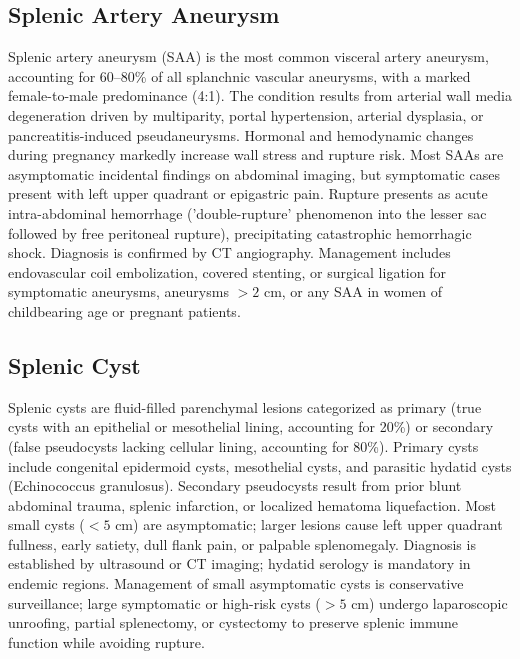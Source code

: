 \subsection{Splenic Artery Aneurysm}
\label{sec:Splenic Artery Aneurysm}
Splenic artery aneurysm (SAA) is the most common visceral artery aneurysm, accounting for 60--80\% of all splanchnic vascular aneurysms, with a marked female-to-male predominance (4:1). The condition results from arterial wall media degeneration driven by multiparity, portal hypertension, arterial dysplasia, or pancreatitis-induced pseudaneurysms. Hormonal and hemodynamic changes during pregnancy markedly increase wall stress and rupture risk. Most SAAs are asymptomatic incidental findings on abdominal imaging, but symptomatic cases present with left upper quadrant or epigastric pain. Rupture presents as acute intra-abdominal hemorrhage ('double-rupture' phenomenon into the lesser sac followed by free peritoneal rupture), precipitating catastrophic hemorrhagic shock. Diagnosis is confirmed by CT angiography. Management includes endovascular coil embolization, covered stenting, or surgical ligation for symptomatic aneurysms, aneurysms $>2$ cm, or any SAA in women of childbearing age or pregnant patients.

\subsection{Splenic Cyst}
\label{sec:Splenic Cyst}
Splenic cysts are fluid-filled parenchymal lesions categorized as primary (true cysts with an epithelial or mesothelial lining, accounting for 20\%) or secondary (false pseudocysts lacking cellular lining, accounting for 80\%). Primary cysts include congenital epidermoid cysts, mesothelial cysts, and parasitic hydatid cysts (Echinococcus granulosus). Secondary pseudocysts result from prior blunt abdominal trauma, splenic infarction, or localized hematoma liquefaction. Most small cysts ($<5$ cm) are asymptomatic; larger lesions cause left upper quadrant fullness, early satiety, dull flank pain, or palpable splenomegaly. Diagnosis is established by ultrasound or CT imaging; hydatid serology is mandatory in endemic regions. Management of small asymptomatic cysts is conservative surveillance; large symptomatic or high-risk cysts ($>5$ cm) undergo laparoscopic unroofing, partial splenectomy, or cystectomy to preserve splenic immune function while avoiding rupture.

